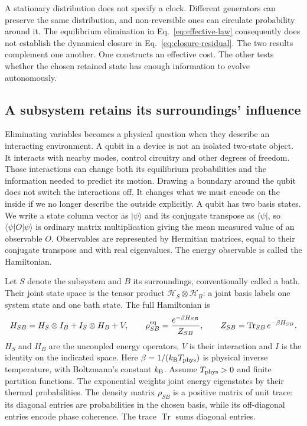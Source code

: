 A stationary distribution does not specify a clock. Different generators can preserve the same distribution, and non-reversible ones can circulate probability around it. The equilibrium elimination in Eq.~\eqref{eq:effective-law} consequently does not establish the dynamical closure in Eq.~\eqref{eq:closure-residual}. The two results complement one another. One constructs an effective cost. The other tests whether the chosen retained state has enough information to evolve autonomously.

\subsection{A subsystem retains its surroundings' influence}
Eliminating variables becomes a physical question when they describe an interacting environment. A qubit in a device is not an isolated two-state object. It interacts with nearby modes, control circuitry and other degrees of freedom. Those interactions can change both its equilibrium probabilities and the information needed to predict its motion. Drawing a boundary around the qubit does not switch the interactions off. It changes what we must encode on the inside if we no longer describe the outside explicitly. A qubit has two basis states. We write a state column vector as $|\psi\rangle$ and its conjugate transpose as $\langle\psi|$, so $\langle\psi|O|\psi\rangle$ is ordinary matrix multiplication giving the mean measured value of an observable $O$. Observables are represented by Hermitian matrices, equal to their conjugate transpose and with real eigenvalues. The energy observable is called the Hamiltonian.

Let $S$ denote the subsystem and $B$ its surroundings, conventionally called a bath. Their joint state space is the tensor product $\mathcal H_S\otimes\mathcal H_B$: a joint basis labels one system state and one bath state. The full Hamiltonian is
\begin{equation}
 H_{SB}=H_S\otimes I_B+I_S\otimes H_B+V,
 \qquad
 \rho_{SB}^{\rm eq}=\frac{e^{-\beta H_{SB}}}{Z_{SB}},
 \qquad
 Z_{SB}=\operatorname{Tr}_{SB}e^{-\beta H_{SB}}.
 \label{eq:open-composite}
\end{equation}
$H_S$ and $H_B$ are the uncoupled energy operators, $V$ is their interaction and $I$ is the identity on the indicated space. Here $\beta=1/(k_{\rm B}T_{\rm phys})$ is physical inverse temperature, with Boltzmann's constant $k_{\rm B}$. Assume $T_{\rm phys}>0$ and finite partition functions. The exponential weights joint energy eigenstates by their thermal probabilities. The density matrix $\rho_{SB}$ is a positive matrix of unit trace: its diagonal entries are probabilities in the chosen basis, while its off-diagonal entries encode phase coherence. The trace $\operatorname{Tr}$ sums diagonal entries.


